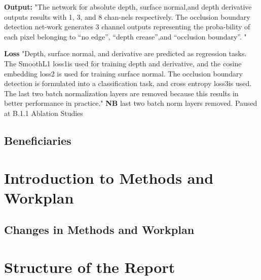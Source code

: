 \textbf{Output:}
"The network for absolute depth, surface normal,and depth derivative outputs results with 1, 3, and 8 chan-nels  respectively.   The  occlusion  boundary  detection  net-work generates 3 channel outputs representing the proba-bility of each pixel belonging to “no edge”, “depth crease”,and “occlusion boundary”.  "
 
\textbf{Loss} "Depth, surface normal, and derivative are predicted as regression tasks.  The SmoothL1 loss1is used for training depth and derivative, and the cosine embedding loss2 is used for training surface normal.  The occlusion boundary detection is formulated into a classification task, and cross entropy loss3is used. The last two batch normalization layers are removed because this results in better performance in practice." \textbf{NB} last two batch norm layers removed. 
Paused at B.1.1 Ablation Studies

 
\lipsum[1]



\subsection{Beneficiaries}
\lipsum[1]


\section{Introduction to Methods and Workplan}
\lipsum[1]


\subsection{Changes in Methods and Workplan}
\lipsum[1]



\section{Structure of the Report}
\lipsum[1]





